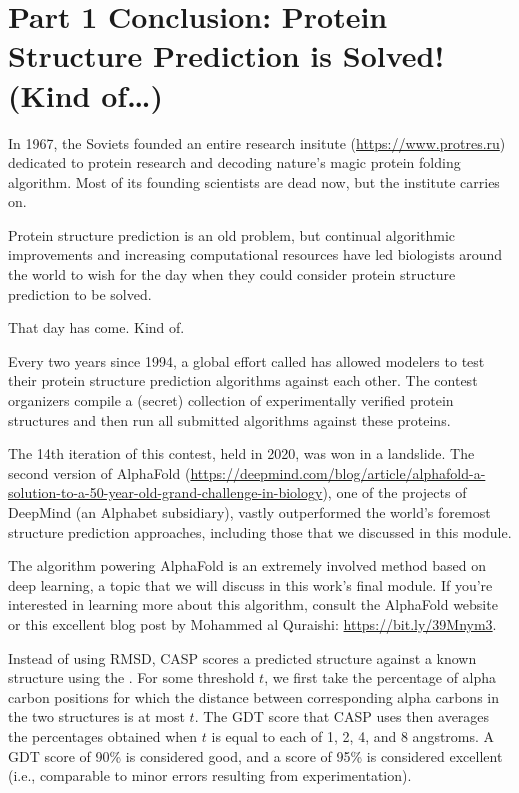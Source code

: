 {{\FloatBarrier
{}

\section{Part 1 Conclusion: Protein Structure Prediction is Solved! (Kind of…)}
\label{sec:conclusion_part_1}

In 1967, the Soviets founded an entire research insitute (\url{https://www.protres.ru}) dedicated to protein research and decoding nature's magic protein folding algorithm. Most of its founding scientists are dead now, but the institute carries on.

Protein structure prediction is an old problem, but continual algorithmic improvements and increasing computational resources have led biologists around the world to wish for the day when they could consider protein structure prediction to be solved.

That day has come. Kind of.

Every two years since 1994, a global effort called  has allowed modelers to test their protein structure prediction algorithms against each other. The contest organizers compile a (secret) collection of experimentally verified protein structures and then run all submitted algorithms against these proteins.

The 14th iteration of this contest, held in 2020, was won in a landslide. The second version of AlphaFold (\url{https://deepmind.com/blog/article/alphafold-a-solution-to-a-50-year-old-grand-challenge-in-biology}), one of the projects of DeepMind (an Alphabet subsidiary), vastly outperformed the world's foremost structure prediction approaches, including those that we discussed in this module.

The algorithm powering AlphaFold is an extremely involved method based on deep learning, a topic that we will discuss in this work's final module. If you're interested in learning more about this algorithm, consult the AlphaFold website or this excellent blog post by Mohammed al Quraishi: \url{https://bit.ly/39Mnym3}.

Instead of using RMSD, CASP scores a predicted structure against a known structure using the . For some threshold $t$, we first take the percentage of alpha carbon positions for which the distance between corresponding alpha carbons in the two structures is at most $t$. The GDT score that CASP uses then averages the percentages obtained when $t$ is equal to each of 1, 2, 4, and 8 angstroms. A GDT score of 90\% is considered good, and a score of 95\% is considered excellent (i.e., comparable to minor errors resulting from experimentation).

}}
